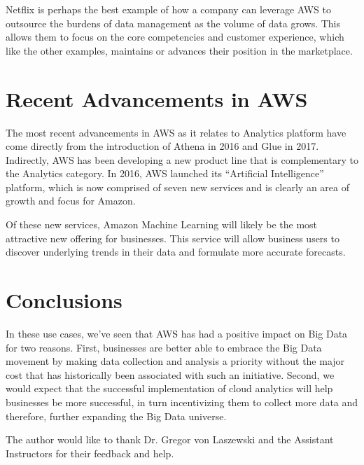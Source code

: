 \documentclass[sigconf]{acmart}
\begin{document}
Netflix is perhaps the best example of how a company can leverage AWS to outsource the burdens of data management as the volume of data grows. This allows them to focus on the core competencies and customer experience, which like the other examples, maintains or advances their position in the marketplace. 

\section{Recent Advancements in AWS}
The most recent advancements in AWS as it relates to Analytics platform have come directly from the introduction of Athena in 2016 and Glue in 2017. Indirectly, AWS has been developing a new product line that is complementary to the Analytics category. In 2016, AWS launched its ``Artificial Intelligence'' platform, which is now comprised of seven new services and is clearly an area of growth and focus for Amazon.

Of these new services, Amazon Machine Learning will likely be the most attractive new offering for businesses. This service will allow business users to discover underlying trends in their data and formulate more accurate forecasts.

\section{Conclusions}
In these use cases, we've seen that AWS has had a positive impact on Big Data for two reasons. First, businesses are better able to embrace the Big Data movement by making data collection and analysis a priority without the major cost that has historically been associated with such an initiative. Second, we would expect that the successful implementation of cloud analytics will help businesses be more successful, in turn incentivizing them to collect more data and therefore, further expanding the Big Data universe.

\begin{acks}
The author would like to thank Dr. Gregor von Laszewski and the Assistant Instructors for their feedback and help.
\end{acks}

 


\end{document}
